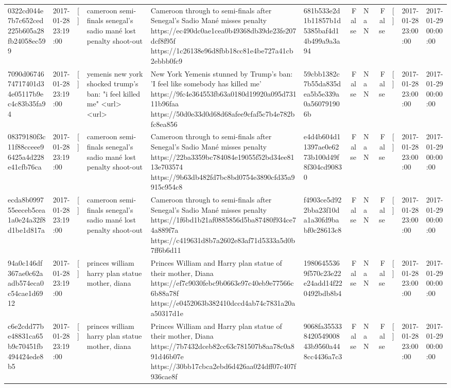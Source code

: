 \begin{tabular}{llllllrlrlll}
0322cd044e7b7c652ced225b605a28fb24058ec599 & 2017-01-28 23:19:00 & [] & cameroon semi-finals senegal's sadio mané lost penalty shoot-out & Cameroon through to semi-finals after Senegal’s Sadio Mané misses penalty https://ec490dc0ae1cea0b49368db39de23fe207dcf8f95f https://1c26138e96d8fbb18cc81e4be727a41cb2ebbb0fc9 & 681b533e2d1b11857b1d5385baf4d14b499a9a3a94 & False & NaN & False & [] & 2017-01-28 23:00:00 & 2017-01-29 00:00:00 \\
7090d0674674717401d34e05117b9ec4c83b35fa94 & 2017-01-28 23:19:00 & [] & yemenis new york shocked trump's ban: "i feel killed me" <url> <url> & New York Yemenis stunned by Trump's ban: 'I feel like somebody has killed me' https://9fc4e364553fb63a0180d19920a095d73111b96faa https://50d0e33d0d68d68afee9cfaf5c7b4e782bfc8ea856 & 59cbb1382c7b55da835dea5b5e339a0a560791906b & False & NaN & False & [] & 2017-01-28 23:00:00 & 2017-01-29 00:00:00 \\
08379180f3c11f88cceee96425a4d228e41cfb76ca & 2017-01-28 23:19:00 & [] & cameroon semi-finals senegal's sadio mané lost penalty shoot-out & Cameroon through to semi-finals after Senegal’s Sadio Mané misses penalty https://22ba3359bc784084e19055f52bd34ee8113e703574 https://9b63db482fd7bc8bd0754e3890cfd35a9915c954c8 & e4d4b604d11397ae0e6273b100d49f8f304cd90830 & False & NaN & False & [] & 2017-01-28 23:00:00 & 2017-01-29 00:00:00 \\
ecda8b099755eeceb5cea1a0e24a32f8d1be1d817a & 2017-01-28 23:19:00 & [] & cameroon semi-finals senegal's sadio mané lost penalty shoot-out & Cameroon through to semi-finals after Senegal’s Sadio Mané misses penalty https://1f6bd1b21af0885856d5ba87480f934ce74a889f7a https://c419631d8b7a2602e83af71d5333a5d0b7ff6b6d11 & f4903ce5d922bba23f10da1a30fd9babf0c28613c8 & False & NaN & False & [] & 2017-01-28 23:00:00 & 2017-01-29 00:00:00 \\
94a0c146df367ae0c62aadb574eca0c54cae1d6912 & 2017-01-28 23:19:00 & [] & princes william harry plan statue mother, diana & Princes William and Harry plan statue of their mother, Diana https://ef7c9030febc9b0663e97c40eb9e77566c6b88a78f https://e0452063b382410dccd4ab74c7831a20aa50317d1e & 19806455369f570c23e22e24add14f220492bdb8b4 & False & NaN & False & [] & 2017-01-28 23:00:00 & 2017-01-29 00:00:00 \\
c6e2cdd77be48831ca65b9c70451fb494424ede8b5 & 2017-01-28 23:19:00 & [] & princes william harry plan statue mother, diana & Princes William and Harry plan statue of their mother, Diana https://7b7432dceb82cc63c781507b8aa78c0a891d46b07e https://30bb17cbca2ebd6d426aa024dff07c407f936cae8f & 9068fa35533842054900843b9560a448cc4436a7c3 & False & NaN & False & [] & 2017-01-28 23:00:00 & 2017-01-29 00:00:00 \\

\end{tabular}
